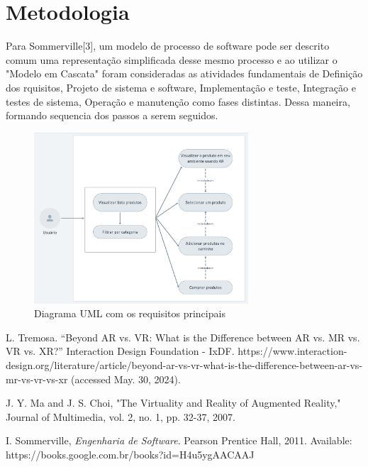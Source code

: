 \documentclass[conference]{IEEEtran}
\begin{document}
\section{Metodologia}
Para Sommerville[3], um modelo de processo de software pode ser descrito comum
uma representação simplificada desse mesmo processo e ao utilizar o "Modelo em
Cascata" foram consideradas as atividades fundamentais de Definição dos
rquisitos, Projeto de sistema e software, Implementação e teste, Integração e
testes de sistema, Operação e manutenção como fases distintas. Dessa maneira,
formando sequencia dos passos a serem seguidos.

\begin{figure}[h]
  \caption{Diagrama UML com os requisitos principais}

  \centering %
  \includegraphics[width=8cm]{assets/user_uml_diagram.png} %
\end{figure}

\begin{thebibliography}{00}
  L. Tremosa. “Beyond AR vs. VR: What is the Difference between AR vs. MR vs. VR vs. XR?” Interaction Design Foundation - IxDF. https://www.interaction-design.org/literature/article/beyond-ar-vs-vr-what-is-the-difference-between-ar-vs-mr-vs-vr-vs-xr (accessed May. 30, 2024).

  J. Y. Ma and J. S. Choi, "The Virtuality and Reality of Augmented Reality," Journal of Multimedia, vol. 2, no. 1, pp. 32-37, 2007.

  I. Sommerville, \emph{Engenharia de Software}. Pearson Prentice Hall, 2011. Available: https://books.google.com.br/books?id=H4u5ygAACAAJ

\end{thebibliography}
\end{document}

